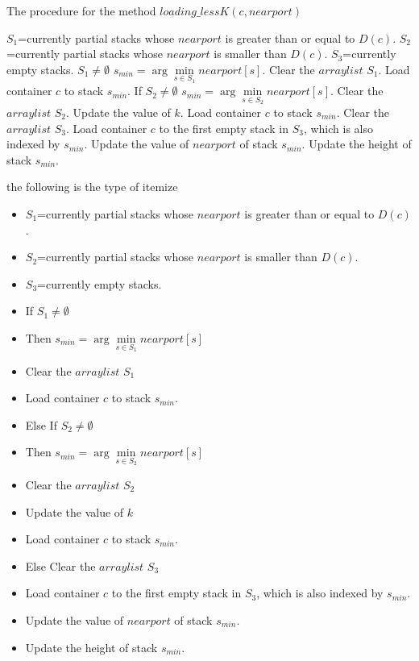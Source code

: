 \documentclass[review,3p,times,authoryear,12pt]{elsarticle}
\begin{document}
\begin{algorithm}[htbp]
    \caption{The procedure for the method $loading\_lessK(c,nearport)$}
    \label{alg:3}
    \begin{codebox}
        \li $S_1$=currently partial stacks whose $nearport$ is greater than or equal to $D(c)$.
        \li $S_2$=currently partial stacks whose $nearport$ is smaller than $D(c)$.
        \li $S_3$=currently empty stacks.
        \li \If $S_1\neq \emptyset$
        \li \Then
                        $s_{min}=\arg\min \limits_{s\in S_1} nearport[s]$.
        \li             Clear the $arraylist$ $S_1$.
        \li             Load container $c$ to stack $s_{min}$.
        \li    \Else If $S_2\neq \emptyset$
                        \Then
        \li               $s_{min}=\arg\min \limits_{s\in S_2} nearport[s]$.
        \li               Clear the $arraylist$ $S_2$.
        \li               Update the value of $k$.
        \li               Load container $c$ to stack $s_{min}$.
        \li         \Else
        \li               Clear the $arraylist$ $S_3$.
        \li               Load container $c$ to the first empty stack in $S_3$, which is also indexed by $s_{min}$.
                    \End
             \End
        \li Update the value of $nearport$ of stack $s_{min}$.
        \li Update the height of stack $s_{min}$.
\end{codebox}
\end{algorithm}



the following is the type of itemize

\begin{itemize}
\label{item:1}
\item $S_1$=currently partial stacks whose $nearport$ is greater than or equal to $D(c)$.
\item $S_2$=currently partial stacks whose $nearport$ is smaller than $D(c)$.
\item $S_3$=currently empty stacks.
\item If $S_1\neq \emptyset$
\item Then $s_{min}=\arg\min \limits_{s\in S_1} nearport[s]$
\item Clear the $arraylist$ $S_1$
\item Load container $c$ to stack $s_{min}$.
\item Else If $S_2\neq \emptyset$
\item Then $s_{min}=\arg\min \limits_{s\in S_2} nearport[s]$
\item Clear the $arraylist$ $S_2$
\item Update the value of $k$
\item Load container $c$ to stack $s_{min}$.
\item Else Clear the $arraylist$ $S_3$
\item Load container $c$ to the first empty stack in $S_3$, which is also indexed by $s_{min}$.
\item Update the value of $nearport$ of stack $s_{min}$.
\item Update the height of stack $s_{min}$.
\end{itemize}
\end{document}
